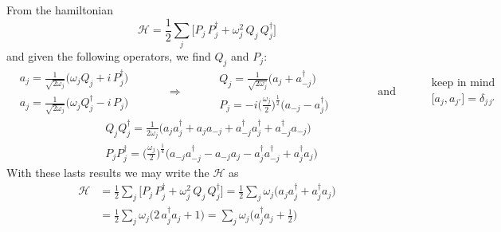 \documentclass[class=article]{standalone}
\begin{document}
From the hamiltonian
\begin{equation*}
\mathcal{H} = \frac{1}{2} \sum_j \Big[ P_j\,P_j^{\dagger} + \omega_j^2 \, Q_j\,Q_j^{\dagger}  \Big]
\end{equation*}
and given the following operators, we find $Q_j$ and $P_j$:
\begin{equation*}
\begin{split}
& a_j = \frac{1}{\sqrt{2\omega_j}} \Big( \omega_j Q_j + i\,P_j^{\dagger} \Big) \\
& a_j = \frac{1}{\sqrt{2\omega_j}} \Big( \omega_j Q_j^{\dagger} - i\,P_j \Big) 
\end{split}\quad\quad\quad\Rightarrow\quad\quad
\begin{split}
& Q_j = \frac{1}{\sqrt{2\omega_j}} \Big( a_j + a_{-j}^{\dagger} \Big) \\
& P_j = -i \Big( \frac{\omega_j}{2} \Big)^{\frac{1}{2}} \Big( a_{-j} - a_j^{\dagger} \Big)
\end{split}\quad\quad\quad\quad \mbox{and} \quad\quad
\begin{split}
& \mbox{keep in mind} \\
& \Big[ a_j , a_{j'} \Big] = \delta_{j \, j'}
\end{split}
\end{equation*}
\begin{equation*}
\begin{split}
& Q_j Q_j^{\dagger} = \frac{1}{2 \omega_j} \Big( a_j a_j^{\dagger} + a_j a_{-j} + a_{-j}^{\dagger} a_j^{\dagger} + a_{-j}^{\dagger} a_{-j} \Big) \\
& P_j P_j^{\dagger} =  \Big( \frac{\omega_j}{2} \Big)^{\frac{1}{4}} \Big( a_{-j} a_{-j}^{\dagger} - a_{-j} a_j - a_j^{\dagger}a_{-j}^{\dagger} + a_j^{\dagger} a_j \Big)
\end{split}
\end{equation*}
With these lasts results we may write the $\mathcal{H}$ as
\begin{equation*}
\begin{split}
\mathcal{H} & = \frac{1}{2} \sum_j \Big[ P_j\,P_j^{\dagger} + \omega_j^2 \, Q_j\,Q_j^{\dagger}  \Big]
 =  \frac{1}{2} \sum_j \omega_j \Big( a_j a_j^{\dagger} + a_j^{\dagger} a_j \Big) \\
& =  \frac{1}{2} \sum_j  \omega_j \Big( 2 \, a_j^{\dagger} a_j + 1 \Big)
= \sum_j  \omega_j \Big( a_j^{\dagger} a_j + \frac{1}{2} \Big)
\end{split}
\end{equation*}
\end{document}
